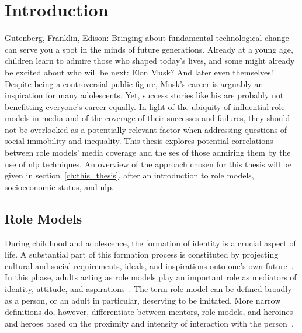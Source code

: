 \renewcommand{\imagepath}{../10-intro/img}

\chapter{Introduction}\label{ch:intro}
Gutenberg, Franklin, Edison: Bringing about fundamental technological change can serve you a spot in the minds of future generations. Already at a young age, children learn to admire those who shaped today's lives, and some might already be excited about who will be next: Elon Musk? And later even themselves! Despite being a controversial public figure, Musk's career is arguably an inspiration for many adolescents. Yet, success stories like his are probably not benefitting everyone's career equally. In light of the ubiquity of influential role models in media and of the coverage of their successes and failures, they should not be overlooked as a potentially relevant factor when addressing questions of social immobility and inequality. This thesis explores potential correlations between role models' media coverage and the \gls{ses} of those admiring them by the use of \gls{nlp} techniques. An overview of the approach chosen for this thesis will be given in section~\ref{ch:this_thesis}, after an introduction to role models, socioeconomic status, and \gls{nlp}.

\section{Role Models}\label{ch:role_models}
During childhood and adolescence, the formation of identity is a crucial aspect of life. A substantial part of this formation process is constituted by projecting cultural and social requirements, ideals, and inspirations onto one's own future~\autocite{mcadams_psychology_2001}. In this phase, adults acting as role models play an important role as mediators of identity, attitude, and aspirations~\autocite{hurd_role_2011-1, morgenroth_how_2015}. The term role model can be defined broadly as a person, or an adult in particular, deserving to be imitated. More narrow definitions do, however, differentiate between mentors, role models, and heroines and heroes based on the proximity and intensity of interaction with the person~\autocite{pleiss_mentors_1995}.

